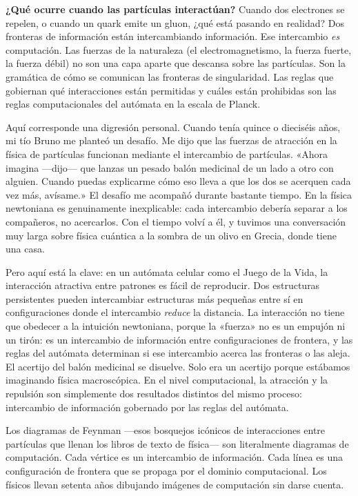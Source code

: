 \documentclass[11pt, twoside, openright]{book}
\begin{document}
\textbf{¿Qué ocurre cuando las partículas interactúan?} Cuando dos electrones se repelen, o cuando un quark emite un gluon, ¿qué está pasando en realidad? Dos fronteras de información están intercambiando información. Ese intercambio \textit{es} computación. Las fuerzas de la naturaleza (el electromagnetismo, la fuerza fuerte, la fuerza débil) no son una capa aparte que descansa sobre las partículas. Son la gramática de cómo se comunican las fronteras de singularidad. Las reglas que gobiernan qué interacciones están permitidas y cuáles están prohibidas son las reglas computacionales del autómata en la escala de Planck.

Aquí corresponde una digresión personal. Cuando tenía quince o dieciséis años, mi tío Bruno me planteó un desafío. Me dijo que las fuerzas de atracción en la física de partículas funcionan mediante el intercambio de partículas. «Ahora imagina ---dijo--- que lanzas un pesado balón medicinal de un lado a otro con alguien. Cuando puedas explicarme cómo eso lleva a que los dos se acerquen cada vez más, avísame.» El desafío me acompañó durante bastante tiempo. En la física newtoniana es genuinamente inexplicable: cada intercambio debería separar a los compañeros, no acercarlos. Con el tiempo volví a él, y tuvimos una conversación muy larga sobre física cuántica a la sombra de un olivo en Grecia, donde tiene una casa.

Pero aquí está la clave: en un autómata celular como el Juego de la Vida, la interacción atractiva entre patrones es fácil de reproducir. Dos estructuras persistentes pueden intercambiar estructuras más pequeñas entre sí en configuraciones donde el intercambio \textit{reduce} la distancia. La interacción no tiene que obedecer a la intuición newtoniana, porque la «fuerza» no es un empujón ni un tirón: es un intercambio de información entre configuraciones de frontera, y las reglas del autómata determinan si ese intercambio acerca las fronteras o las aleja. El acertijo del balón medicinal se disuelve. Solo era un acertijo porque estábamos imaginando física macroscópica. En el nivel computacional, la atracción y la repulsión son simplemente dos resultados distintos del mismo proceso: intercambio de información gobernado por las reglas del autómata.

Los diagramas de Feynman ---esos bosquejos icónicos de interacciones entre partículas que llenan los libros de texto de física--- son literalmente diagramas de computación. Cada vértice es un intercambio de información. Cada línea es una configuración de frontera que se propaga por el dominio computacional. Los físicos llevan setenta años dibujando imágenes de computación sin darse cuenta.
\end{document}
